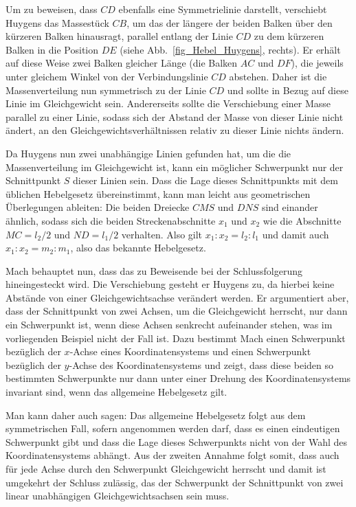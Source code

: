 Um zu beweisen, dass $CD$ ebenfalls eine Symmetrielinie darstellt, verschiebt Huygens
das Massest\"uck $CB$, um das der l\"angere der beiden Balken \"uber den k\"urzeren
Balken hinausragt, parallel entlang der Linie $CD$ zu dem k\"urzeren Balken in die Position
$DE$ (siehe Abb.\ \ref{fig_Hebel_Huygens}, rechts). Er erh\"alt auf diese Weise zwei Balken gleicher
L\"ange (die Balken $AC$ und $DF$), die jeweils unter gleichem Winkel von der Verbindungslinie 
$CD$ abstehen. Daher ist die Massenverteilung nun symmetrisch zu der Linie $CD$ und 
sollte in Bezug auf diese Linie
im Gleichgewicht sein. Andererseits sollte die Verschiebung einer Masse parallel zu einer Linie, 
sodass sich der Abstand der Masse von dieser Linie nicht \"andert, an den 
Gleichgewichtsverh\"altnissen relativ zu dieser Linie nichts \"andern. 

Da Huygens nun zwei unabh\"angige Linien gefunden hat, um die die Massenverteilung im
Gleichgewicht ist, kann ein m\"oglicher Schwerpunkt nur der Schnittpunkt $S$ dieser Linien sein. 
Dass die Lage dieses Schnittpunkts mit dem \"ublichen Hebelgesetz \"ubereinstimmt, kann man
leicht aus geometrischen \"Uberlegungen ableiten: Die beiden Dreiecke $CMS$ und $DNS$ sind
einander \"ahnlich, sodass sich die beiden Streckenabschnitte $x_1$ und $x_2$ wie die
Abschnitte $MC=l_2/2$ und $ND=l_1/2$ verhalten. Also gilt $x_1:x_2=l_2:l_1$ und damit
auch $x_1:x_2=m_2:m_1$, also das bekannte Hebelgesetz.

Mach behauptet nun, dass das zu Beweisende bei der Schlussfolgerung hineingesteckt wird.
Die Verschiebung gesteht er Huygens zu, da hierbei keine Abst\"ande von einer Gleichgewichtsachse
ver\"andert werden. Er argumentiert aber, dass der Schnittpunkt von
zwei Achsen, um die Gleichgewicht herrscht, nur dann ein Schwerpunkt ist, wenn diese Achsen
senkrecht aufeinander stehen, was im vorliegenden Beispiel nicht der Fall ist. Dazu bestimmt Mach einen
Schwerpunkt bez\"uglich der $x$-Achse eines Koordinatensystems und einen Schwerpunkt 
bez\"uglich der $y$-Achse des Koordinatensystems und zeigt, dass diese beiden so bestimmten
Schwerpunkte nur dann unter einer Drehung des Koordinatensystems invariant sind, wenn das
allgemeine Hebelgesetz gilt. 

Man kann daher auch sagen: Das allgemeine Hebelgesetz folgt aus dem symmetrischen Fall, sofern
angenommen werden darf, dass es einen eindeutigen Schwerpunkt gibt und dass die Lage
dieses Schwerpunkts nicht von der Wahl des Koordinatensystems abh\"angt. Aus der zweiten
Annahme folgt somit, dass auch f\"ur jede Achse durch den Schwerpunkt Gleichgewicht herrscht und
damit ist umgekehrt der Schluss zul\"assig, das der Schwerpunkt der Schnittpunkt von zwei
linear unabh\"angigen Gleichgewichtsachsen sein muss.


